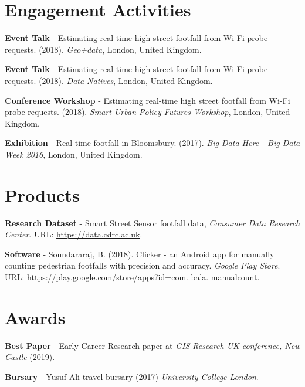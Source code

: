 \section*{Engagement Activities}
\vspace{0.2cm} \par \noindent \textbf{Event Talk} - Estimating real-time high street footfall from Wi-Fi probe requests. (2018). \textit{Geo+data}, London, United Kingdom.
\vspace{0.2cm} \par \noindent \textbf{Event Talk} - Estimating real-time high street footfall from Wi-Fi probe requests. (2018). \textit{Data Natives}, London, United Kingdom.
\vspace{0.2cm} \par \noindent \textbf{Conference Workshop} - Estimating real-time high street footfall from Wi-Fi probe requests. (2018). \textit{Smart Urban Policy Futures Workshop}, London, United Kingdom.
\vspace{0.2cm} \par \noindent \textbf{Exhibition} - Real-time footfall in Bloomsbury. (2017). \textit{Big Data Here - Big Data Week 2016}, London, United Kingdom.

\section*{Products}
\vspace{0.2cm} \par \noindent \textbf{Research Dataset} - Smart Street Sensor footfall data, \textit{Consumer Data Research Center}. URL: \url{https://data.cdrc.ac.uk}.
\vspace{0.2cm} \par \noindent \textbf{Software} - Soundararaj, B. (2018). Clicker - an Android app for manually counting pedestrian footfalls with precision and accuracy. \textit{Google Play Store}. URL: \url{https://play.google.com/store/apps?id=com. bala. manualcount}.

\section*{Awards}
\vspace{0.2cm} \par \noindent \textbf{Best Paper} - Early Career Research paper at \textit{GIS Research UK conference, New Castle} (2019).
\vspace{0.2cm} \par \noindent \textbf{Bursary} - Yusuf Ali travel bursary (2017) \textit{University College London}.

